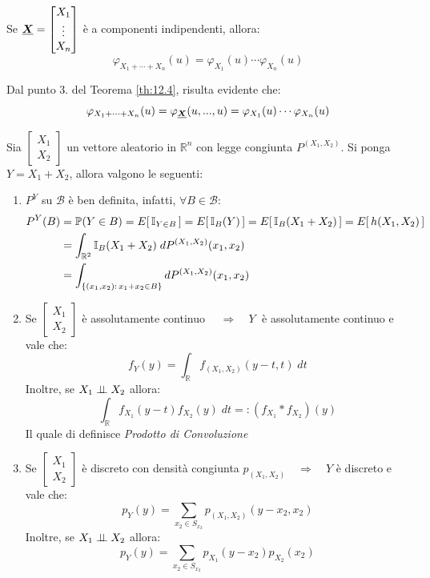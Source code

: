 \begin{corollario}
    Se $\underline{{\boldsymbol{X}}}=\begin{bmatrix}X_1 \\ \vdots \\X_n\end{bmatrix}$ è a componenti indipendenti, allora:
    \[\varphi_{X_1+\cdots+X_n}(u) = \varphi_{X_1}(u)\cdots \varphi_{X_n}(u)\]
    \begin{dimostrazione}
        Dal punto 3. del Teorema \ref{th:12.4}, risulta evidente che:
        \[\varphi_{X_1+\cdots+X_n}(u) = \varphi_{\underline{{\boldsymbol{X}}}}(u, ..., u) = \varphi_{X_1}(u)\cdots \varphi_{X_n}(u)\]
    \end{dimostrazione}
\end{corollario}


\begin{teorema}
    Sia $\begin{bmatrix}X_1\\X_2\end{bmatrix}$ un vettore aleatorio in $\mathbb{R}^n$ con legge congiunta $P^{(X_1, X_2)}$. Si ponga $Y = X_1+X_2$, allora valgono le seguenti:
    \begin{enumerate}
        \item $P^Y$ su $\mathcal{B}$ è ben definita, infatti, $\forall B\in\mathcal{B}:$
        \begin{align*}
            P^Y(B) & = \mathbb{P}(Y\in B) = E\!\left[\,\mathbb{I}_{Y\in B}\,\right] = E\!\left[\,\mathbb{I}_B(Y)\,\right] = E\!\left[\,\mathbb{I}_B(X_1+X_2)\,\right] = E\!\left[\,h(X_1, X_2)\,\right] \\
            & = \int_{\mathbb{R}^2} \mathbb{I}_B(X_1+X_2)\;dP^{(X_1, X_2)}(x_1, x_2) \\ 
            & = \int_{\{(x_1, x_2):\, x_1+x_2\in B\}} dP^{(X_1, X_2)}(x_1, x_2)
        \end{align*}
        \item Se $\begin{bmatrix}X_1\\X_2\end{bmatrix}$ è assolutamente continuo $\quad \Rightarrow\quad Y \;$ è assolutamente continuo e vale che:
        \[\boxed{f_Y(y) = \int_\mathbb{R} f_{(X_1, X_2)}(y-t, t)\;dt}\]
        Inoltre, se $X_1\mathrel{\perp\!\!\!\perp} X_2$ allora:
        \[\boxed{\int_\mathbb{R}f_{X_1}(y-t)f_{X_2}(y)\;dt =:(f_{X_1} * f_{X_2})(y)}\]
        Il quale di definisce \textit{Prodotto di Convoluzione}
        \item Se $\begin{bmatrix}X_1\\X_2\end{bmatrix}$ è discreto con densità congiunta $p_{(X_1, X_2)} \quad \Rightarrow\quad Y$ è discreto e vale che:
        \[\boxed{p_{Y}(y) = \sum_{x_2\in S_{x_2}} p_{(X_1, X_2)}(y-x_2,  x_2)}\]
        Inoltre, se $X_1\mathrel{\perp\!\!\!\perp} X_2$ allora:
        \[\boxed{p_Y(y) = \sum_{x_2 \in S_{x_2}}p_{X_1}(y-x_2)p_{X_2}(x_2)}\]
    \end{enumerate}
\end{teorema}



